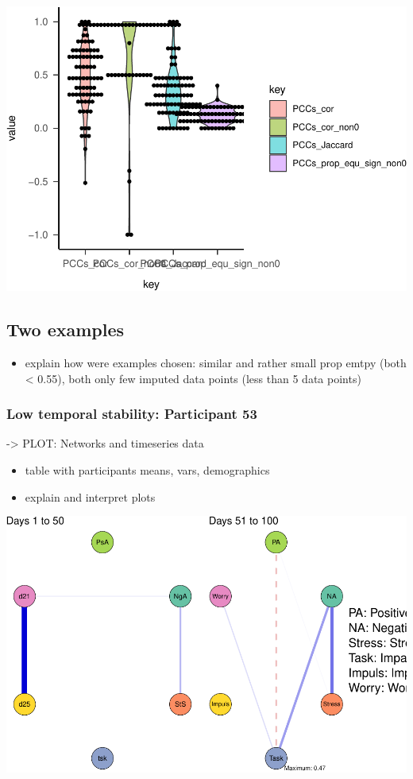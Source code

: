 \documentclass[
  english,
  man]{apa6}
\providecommand{\tightlist}{%
  \setlength{\itemsep}{0pt}\setlength{\parskip}{0pt}}
\begin{document}
\includegraphics{ThesisAnalysisV2_files/figure-latex/comparisonsplot-1.pdf}

\hypertarget{two-examples}{%
\subsection{Two examples}\label{two-examples}}

\begin{itemize}
\tightlist
\item
  explain how were examples chosen: similar and rather small prop emtpy (both \textless{} 0.55), both only few imputed data points (less than 5 data points)
\end{itemize}

\hypertarget{low-temporal-stability-participant-53}{%
\subsubsection{Low temporal stability: Participant 53}\label{low-temporal-stability-participant-53}}

-\textgreater{} PLOT: Networks and timeseries data

\begin{itemize}
\tightlist
\item
  table with participants means, vars, demographics
\item
  explain and interpret plots
\end{itemize}

\includegraphics{ThesisAnalysisV2_files/figure-latex/plotPx53Netws-1.pdf}
\end{document}
